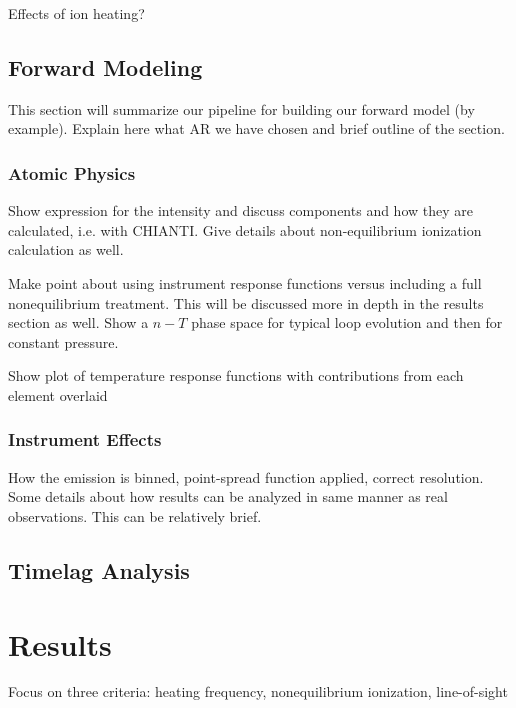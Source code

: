 \documentclass[modern,linenumbers]{aastex62}
\begin{document}
Effects of ion heating?

\subsection{Forward Modeling}
\label{forward}
This section will summarize our pipeline for building our forward model (by example). Explain here what AR we have chosen and brief outline of the section.

\subsubsection{Atomic Physics}
\label{atomic}
Show expression for the intensity and discuss components and how they are calculated, i.e. with CHIANTI. Give details about non-equilibrium ionization calculation as well.

Make point about using instrument response functions versus including a full nonequilibrium treatment. This will be discussed more in depth in the results section as well. Show a $n-T$ phase space for typical loop evolution and then for constant pressure.

Show plot of temperature response functions with contributions from each element overlaid

\subsubsection{Instrument Effects}
\label{instrument}
How the emission is binned, point-spread function applied, correct resolution. Some details about how results can be analyzed in same manner as real observations. This can be relatively brief.

\subsection{Timelag Analysis}
\label{timelag_analysis}


\section{Results}
\label{results}
Focus on three criteria: heating frequency, nonequilibrium ionization, line-of-sight
\end{document}
